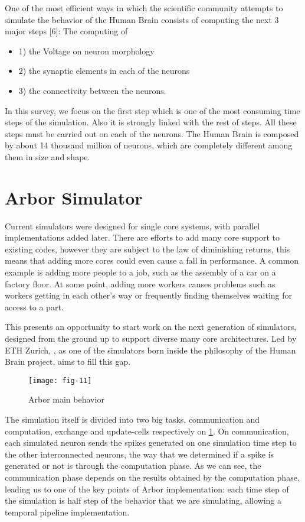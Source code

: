 One of the most efficient ways in which the scientific community attempts
to simulate the behavior of the Human Brain consists of computing the 
next 3 major steps [6]: The computing of 
\begin{itemize}
    \item 1) the Voltage on neuron morphology
    \item 2) the synaptic elements in each of the neurons
    \item 3) the connectivity between the neurons.
\end{itemize}

In this survey, we focus on the first step which is one of the most 
consuming time steps of the simulation. Also it is strongly linked with 
the rest of steps. All these steps must be carried out on each of the 
neurons. The Human Brain is composed by about 14 thousand million of 
neurons, which are completely different among them in size and shape.


\vspace{10ex}
\section{Arbor Simulator}

Current simulators were designed for single core systems, with parallel implementations
added later. There are efforts to add many core support to existing codes, however they
are subject to the law of diminishing returns, this means that adding more cores could
even cause a fall in performance. A common example is adding more people to a job,
such as the assembly of a car on a factory floor. At some point, adding more workers causes problems such as workers getting in each other’s way or frequently finding
themselves waiting for access to a part.

This presents an opportunity to start work on the next generation of simulators,
designed from the ground up to support diverse many core architectures. Led by ETH
Zurich, \cite{Arbor}, as one of the simulators born inside the philosophy
 of the Human Brain project, aims to fill this gap.

\vspace{5ex}
\begin{figure}[htbp]
    \centering
    \texttt{[image: fig-11]}
    \label{fig:11}
    \caption{Arbor main behavior}
\end{figure}

The simulation itself is divided into two big tasks, communication and computation, exchange and update-cells respectively on \ref{fig:11}. On communication, each
simulated neuron sends the spikes generated on one simulation time step to the other
interconnected neurons, the way that we determined if a spike is generated or not is
through the computation phase. As we can see, the communication phase depends on
the results obtained by the computation phase, leading us to one of the key points of
Arbor implementation: each time step of the simulation is half step of the behavior
that we are simulating, allowing a temporal pipeline implementation.

